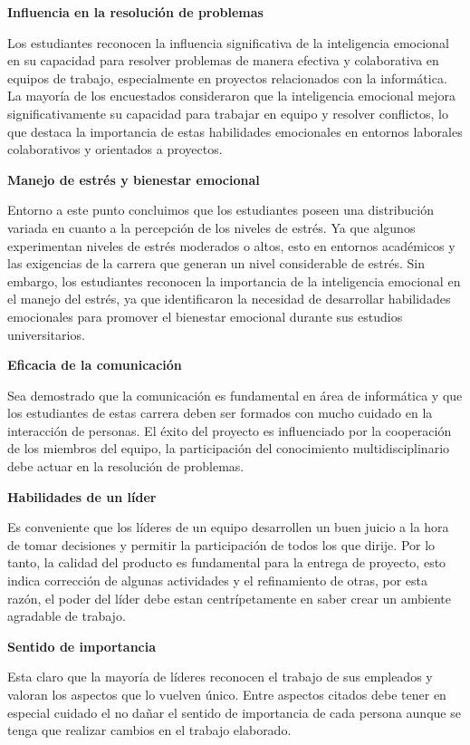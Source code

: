\documentclass[journal]{IEEEtran}
\begin{document}
\begin{center}
	\textbf{Influencia en la resolución de problemas}
\end{center}
Los estudiantes reconocen la influencia significativa de la inteligencia emocional en su capacidad para resolver problemas de manera efectiva y colaborativa en equipos de trabajo, especialmente en proyectos relacionados con la informática. La mayoría de los encuestados consideraron que la inteligencia emocional mejora significativamente su capacidad para trabajar en equipo y resolver conflictos, lo que destaca la importancia de estas habilidades emocionales en entornos laborales colaborativos y orientados a proyectos.
\begin{center}
	\textbf{Manejo de estrés y bienestar emocional}
\end{center}
Entorno a este punto concluimos que los estudiantes poseen una distribución variada en cuanto a la percepción de los niveles de estrés. Ya que algunos experimentan niveles de estrés moderados o altos, esto en entornos académicos y las exigencias de la carrera que generan un nivel considerable de estrés. Sin embargo, los estudiantes reconocen la importancia de la inteligencia emocional en el manejo del estrés, ya que identificaron la necesidad de desarrollar habilidades emocionales para promover el bienestar emocional durante sus estudios universitarios.

\begin{center}
	\textbf{Eficacia de la comunicación}
\end{center}
Sea demostrado que la comunicación es fundamental en área de informática y que los estudiantes de estas carrera deben ser formados con mucho cuidado en la interacción de personas. El éxito del proyecto es influenciado por la cooperación de los miembros del equipo, la participación del conocimiento multidisciplinario debe actuar en la resolución de problemas.


\begin{center}
	\textbf{Habilidades de un líder}
\end{center}
Es conveniente que los líderes de un equipo desarrollen un buen juicio a la hora de tomar decisiones y permitir la participación de todos los que dirije. Por lo tanto, la calidad del producto es fundamental para la entrega de proyecto, esto indica corrección de algunas actividades y el refinamiento de otras, por esta razón, el poder del líder debe estan centrípetamente en saber crear un ambiente agradable de trabajo.

\begin{center}
	\textbf{Sentido de importancia}
\end{center}
Esta claro que la mayoría de líderes reconocen el trabajo de sus empleados y valoran los aspectos que lo vuelven único. Entre aspectos citados debe tener en especial cuidado el no dañar el sentido de importancia de cada persona aunque se tenga que realizar cambios en el trabajo elaborado.
\end{document}
